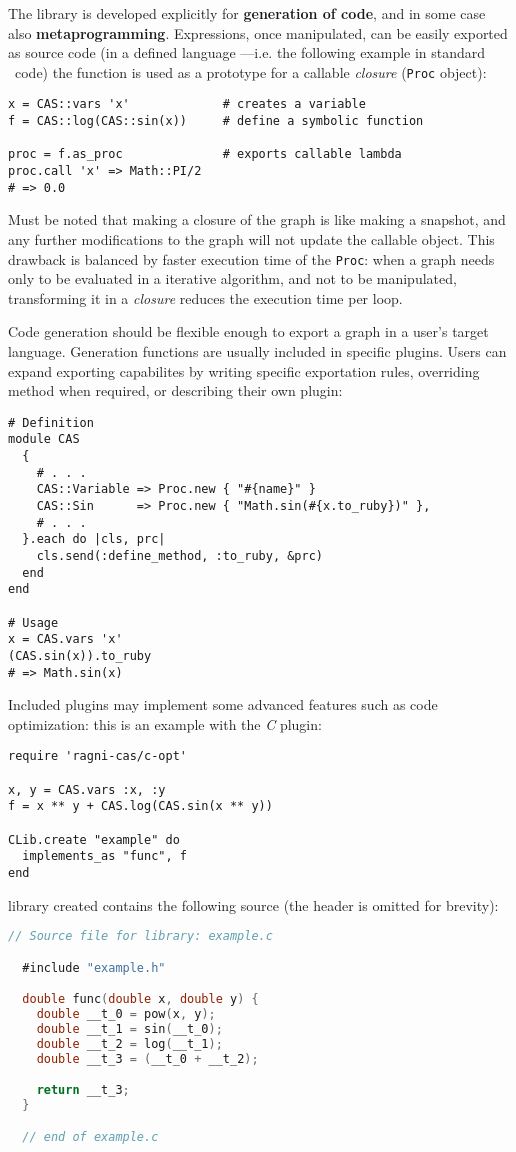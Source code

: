 The library is developed explicitly for \textbf{generation of code}, and in some case also \textbf{meta\-programming}. Expressions, once manipulated, can be easily exported as source code (in a defined language ---i.e. the following example in standard \Ruby~code) the function is used as a prototype for a callable \emph{closure} (\texttt{Proc} object):
\begin{lstlisting}[caption={Graph evaluation example},label={code:example-proc}]
x = CAS::vars 'x'             # creates a variable
f = CAS::log(CAS::sin(x))     # define a symbolic function

proc = f.as_proc              # exports callable lambda
proc.call 'x' => Math::PI/2
# => 0.0
\end{lstlisting}
Must be noted that making a closure of the graph is like making a snapshot, and any further modifications to the graph will not update the callable object. This drawback is balanced by faster execution time of the \texttt{Proc}: when a graph needs only to be evaluated in a iterative algorithm, and not to be manipulated, transforming it in a \emph{closure} reduces the execution time per loop.

Code generation should be flexible enough to export a graph in a user's target language. Generation functions are usually included in specific plugins. Users can expand exporting capabilites by writing specific exportation rules,  overriding method when required, or describing their own plugin:
\begin{lstlisting}[caption={Example of Ruby exportation plugin},label={code:example-exporting}]
# Definition
module CAS
  {
    # . . .
    CAS::Variable => Proc.new { "#{name}" }
    CAS::Sin      => Proc.new { "Math.sin(#{x.to_ruby})" },
    # . . .
  }.each do |cls, prc|
    cls.send(:define_method, :to_ruby, &prc)
  end
end

# Usage
x = CAS.vars 'x'
(CAS.sin(x)).to_ruby
# => Math.sin(x)
\end{lstlisting}

Included plugins may implement some advanced features such as code optimization: this is an example with the \emph{C} plugin:

\begin{lstlisting}[caption={Calling optimized-C exporter},label={code:example-exporting-C-1}]
require 'ragni-cas/c-opt'

x, y = CAS.vars :x, :y
f = x ** y + CAS.log(CAS.sin(x ** y))

CLib.create "example" do
  implements_as "func", f
end
\end{lstlisting}
library created contains the following source (the header is omitted for brevity):
\begin{lstlisting}[caption={Calling optimized-C exporter},label={code:example-exporting-C-2},language=C]
  // Source file for library: example.c

  #include "example.h"

  double func(double x, double y) {
    double __t_0 = pow(x, y);
    double __t_1 = sin(__t_0);
    double __t_2 = log(__t_1);
    double __t_3 = (__t_0 + __t_2);

    return __t_3;
  }

  // end of example.c
\end{lstlisting}
